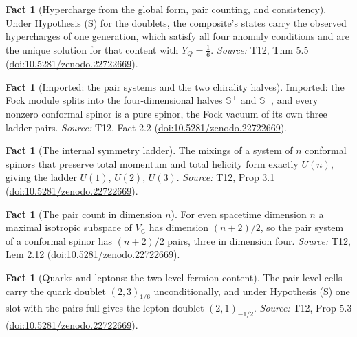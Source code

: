 \documentclass[11pt]{article}
\theoremstyle{definition}
\newtheorem{fact}[theorem]{Fact}
\theoremstyle{plain}
\providecommand{\C}{}\renewcommand{\C}{\mathbb{C}}
\providecommand{\CS}{}\renewcommand{\CS}{{\mathbb{S}^{+}}}
\providecommand{\CSm}{}\renewcommand{\CSm}{{\mathbb{S}^{-}}}
\begin{document}
\begin{fact}[Hypercharge from the global form, pair counting, and consistency]\label{c:standard-model.hypercharge-global-form-pair-counting-consistency}
Under Hypothesis (S) for the doublets, the composite's states carry the observed hypercharges of one generation, which satisfy all four anomaly conditions and are the unique solution for that content with $Y_{Q} = \tfrac16$.
\emph{Source:} T12, Thm 5.5 (\href{https://doi.org/10.5281/zenodo.22722669}{doi:10.5281/zenodo.22722669}).
\end{fact}

\begin{fact}[Imported: the pair systems and the two chirality halves]\label{c:standard-model.imported-pair-systems-two-chirality-halves}
Imported: the Fock module splits into the four-dimensional halves $\CS$ and $\CSm$, and every nonzero conformal spinor is a pure spinor, the Fock vacuum of its own three ladder pairs.
\emph{Source:} T12, Fact 2.2 (\href{https://doi.org/10.5281/zenodo.22722669}{doi:10.5281/zenodo.22722669}).
\end{fact}

\begin{fact}[The internal symmetry ladder]\label{c:standard-model.internal-symmetry-ladder}
The mixings of a system of $n$ conformal spinors that preserve total momentum and total helicity form exactly $U(n)$, giving the ladder $U(1)$, $U(2)$, $U(3)$.
\emph{Source:} T12, Prop 3.1 (\href{https://doi.org/10.5281/zenodo.22722669}{doi:10.5281/zenodo.22722669}).
\end{fact}

\begin{fact}[The pair count in dimension $n$]\label{c:standard-model.pair-count-dimension}
For even spacetime dimension $n$ a maximal isotropic subspace of $V_{\C}$ has dimension $(n+2)/2$, so the pair system of a conformal spinor has $(n+2)/2$ pairs, three in dimension four.
\emph{Source:} T12, Lem 2.12 (\href{https://doi.org/10.5281/zenodo.22722669}{doi:10.5281/zenodo.22722669}).
\end{fact}

\begin{fact}[Quarks and leptons: the two-level fermion content]\label{c:standard-model.quarks-leptons-two-level-fermion-content}
The pair-level cells carry the quark doublet $(2,3)_{1/6}$ unconditionally, and under Hypothesis (S) one slot with the pairs full gives the lepton doublet $(2,1)_{-1/2}$.
\emph{Source:} T12, Prop 5.3 (\href{https://doi.org/10.5281/zenodo.22722669}{doi:10.5281/zenodo.22722669}).
\end{fact}
\end{document}
